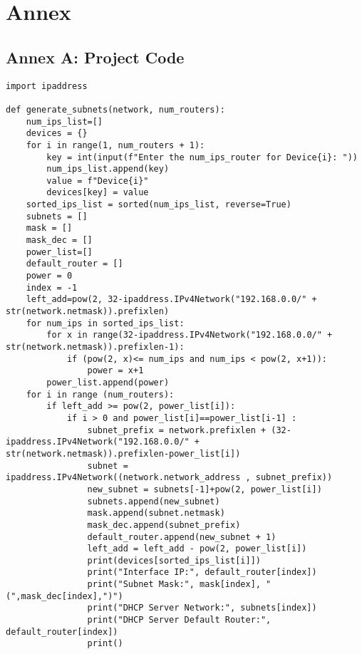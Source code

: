\chapter{Annex}
\section{Annex A: Project Code}


\begin{lstlisting}[style=pythonStyle, caption={Automated Subnet Allocation.}, backgroundcolor=\color{codebackground}]
import ipaddress

def generate_subnets(network, num_routers):
    num_ips_list=[]
    devices = {}
    for i in range(1, num_routers + 1):
        key = int(input(f"Enter the num_ips_router for Device{i}: "))
        num_ips_list.append(key)
        value = f"Device{i}"
        devices[key] = value
    sorted_ips_list = sorted(num_ips_list, reverse=True)
    subnets = []
    mask = []
    mask_dec = []
    power_list=[]
    default_router = []
    power = 0
    index = -1
    left_add=pow(2, 32-ipaddress.IPv4Network("192.168.0.0/" + str(network.netmask)).prefixlen)
    for num_ips in sorted_ips_list:
        for x in range(32-ipaddress.IPv4Network("192.168.0.0/" + str(network.netmask)).prefixlen-1):
            if (pow(2, x)<= num_ips and num_ips < pow(2, x+1)):
                power = x+1
        power_list.append(power)
    for i in range (num_routers):
        if left_add >= pow(2, power_list[i]):
            if i > 0 and power_list[i]==power_list[i-1] :
                subnet_prefix = network.prefixlen + (32-ipaddress.IPv4Network("192.168.0.0/" + str(network.netmask)).prefixlen-power_list[i])
                subnet = ipaddress.IPv4Network((network.network_address , subnet_prefix))
                new_subnet = subnets[-1]+pow(2, power_list[i]) 
                subnets.append(new_subnet)
                mask.append(subnet.netmask)
                mask_dec.append(subnet_prefix)
                default_router.append(new_subnet + 1)
                left_add = left_add - pow(2, power_list[i])
                print(devices[sorted_ips_list[i]])
                print("Interface IP:", default_router[index])
                print("Subnet Mask:", mask[index], "(",mask_dec[index],")")
                print("DHCP Server Network:", subnets[index])
                print("DHCP Server Default Router:", default_router[index])
                print()
            

\end{lstlisting}
